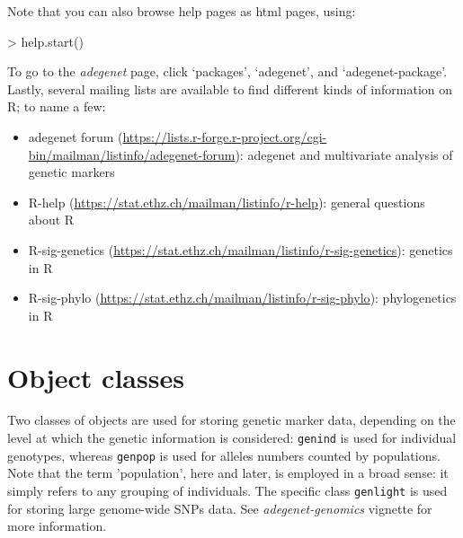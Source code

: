 \documentclass{article}
\begin{document}
Note that you can also browse help pages as html pages, using:
\begin{Schunk}
\begin{Sinput}
> help.start()
\end{Sinput}
\end{Schunk}
To go to the \textit{adegenet} page, click `packages', `adegenet', and
`adegenet-package'.
\\


Lastly, several mailing lists are available to find different kinds of
information on R; to name a few:
\begin{itemize}
\item adegenet forum
  (\url{https://lists.r-forge.r-project.org/cgi-bin/mailman/listinfo/adegenet-forum}):
  adegenet and multivariate analysis of genetic markers
\item R-help (\url{https://stat.ethz.ch/mailman/listinfo/r-help}):
  general questions about R
\item R-sig-genetics
  (\url{https://stat.ethz.ch/mailman/listinfo/r-sig-genetics}):
  genetics in R
\item R-sig-phylo
  (\url{https://stat.ethz.ch/mailman/listinfo/r-sig-phylo}):
  phylogenetics in R
\end{itemize}






\section{Object classes}
Two classes of objects are used for storing genetic marker data, depending on the level at which the genetic information is considered:
\texttt{genind} is used for individual genotypes, whereas \texttt{genpop} is used for alleles numbers counted by populations.
Note that the term 'population', here and later, is employed in a broad sense: it simply refers to any grouping of individuals.
The specific class \texttt{genlight} is used for storing large genome-wide SNPs data.
See \textit{adegenet-genomics} vignette for more information.

\end{document}
